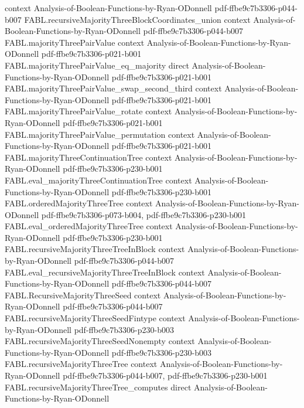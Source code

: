 \begin{theorem}
  {context}
  {Analysis-of-Boolean-Functions-by-Ryan-ODonnell}
  {pdf-ffbe9c7b3306-p044-b007}
\proofstep
  {FABL.recursiveMajorityThreeBlockCoordinates_union}
  {context}
  {Analysis-of-Boolean-Functions-by-Ryan-ODonnell}
  {pdf-ffbe9c7b3306-p044-b007}
\proofstep
  {FABL.majorityThreePairValue}
  {context}
  {Analysis-of-Boolean-Functions-by-Ryan-ODonnell}
  {pdf-ffbe9c7b3306-p021-b001}
\proofstep
  {FABL.majorityThreePairValue_eq_majority}
  {direct}
  {Analysis-of-Boolean-Functions-by-Ryan-ODonnell}
  {pdf-ffbe9c7b3306-p021-b001}
\proofstep
  {FABL.majorityThreePairValue_swap_second_third}
  {context}
  {Analysis-of-Boolean-Functions-by-Ryan-ODonnell}
  {pdf-ffbe9c7b3306-p021-b001}
\proofstep
  {FABL.majorityThreePairValue_rotate}
  {context}
  {Analysis-of-Boolean-Functions-by-Ryan-ODonnell}
  {pdf-ffbe9c7b3306-p021-b001}
\proofstep
  {FABL.majorityThreePairValue_permutation}
  {context}
  {Analysis-of-Boolean-Functions-by-Ryan-ODonnell}
  {pdf-ffbe9c7b3306-p021-b001}
\proofstep
  {FABL.majorityThreeContinuationTree}
  {context}
  {Analysis-of-Boolean-Functions-by-Ryan-ODonnell}
  {pdf-ffbe9c7b3306-p230-b001}
\proofstep
  {FABL.eval_majorityThreeContinuationTree}
  {context}
  {Analysis-of-Boolean-Functions-by-Ryan-ODonnell}
  {pdf-ffbe9c7b3306-p230-b001}
\proofstep
  {FABL.orderedMajorityThreeTree}
  {context}
  {Analysis-of-Boolean-Functions-by-Ryan-ODonnell}
  {pdf-ffbe9c7b3306-p073-b004,
    pdf-ffbe9c7b3306-p230-b001}
\proofstep
  {FABL.eval_orderedMajorityThreeTree}
  {context}
  {Analysis-of-Boolean-Functions-by-Ryan-ODonnell}
  {pdf-ffbe9c7b3306-p230-b001}
\proofstep
  {FABL.recursiveMajorityThreeTreeInBlock}
  {context}
  {Analysis-of-Boolean-Functions-by-Ryan-ODonnell}
  {pdf-ffbe9c7b3306-p044-b007}
\proofstep
  {FABL.eval_recursiveMajorityThreeTreeInBlock}
  {context}
  {Analysis-of-Boolean-Functions-by-Ryan-ODonnell}
  {pdf-ffbe9c7b3306-p044-b007}
\proofstep
  {FABL.RecursiveMajorityThreeSeed}
  {context}
  {Analysis-of-Boolean-Functions-by-Ryan-ODonnell}
  {pdf-ffbe9c7b3306-p044-b007}
\proofstep
  {FABL.recursiveMajorityThreeSeedFintype}
  {context}
  {Analysis-of-Boolean-Functions-by-Ryan-ODonnell}
  {pdf-ffbe9c7b3306-p230-b003}
\proofstep
  {FABL.recursiveMajorityThreeSeedNonempty}
  {context}
  {Analysis-of-Boolean-Functions-by-Ryan-ODonnell}
  {pdf-ffbe9c7b3306-p230-b003}
\proofstep
  {FABL.recursiveMajorityThreeTree}
  {context}
  {Analysis-of-Boolean-Functions-by-Ryan-ODonnell}
  {pdf-ffbe9c7b3306-p044-b007,
    pdf-ffbe9c7b3306-p230-b001}
\proofstep
  {FABL.recursiveMajorityThreeTree_computes}
  {direct}
  {Analysis-of-Boolean-Functions-by-Ryan-ODonnell}

\end{theorem}
